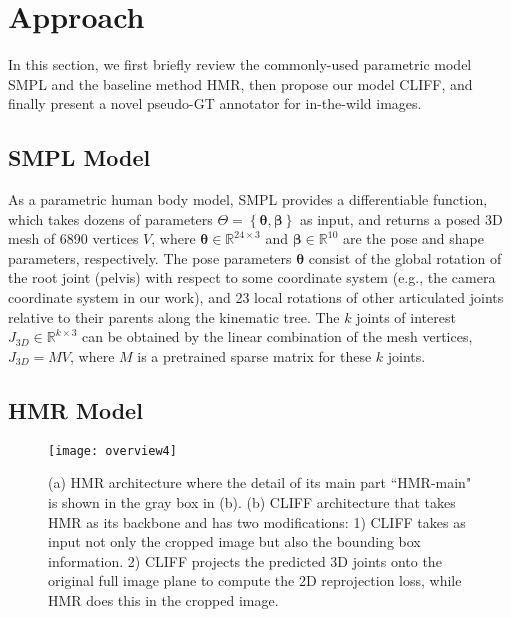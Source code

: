 \documentclass[runningheads]{llncs}
\begin{document}
\section{Approach}\label{sec:approach}

In this section, we first briefly review the commonly-used parametric model SMPL and the baseline method HMR, then propose our model CLIFF, and finally present a novel pseudo-GT annotator for in-the-wild images.

\subsection{SMPL Model}
As a parametric human body model, SMPL \cite{loper2015smpl} provides a differentiable function, which takes dozens of parameters $\Theta = {\left\{ \bm{\theta}, \bm{\beta} \right\}}$ as input, and returns a posed 3D mesh of 6890 vertices $V$, where $\bm{\theta} \in \mathbb{R}^{24\times3}$ and $\bm{\beta} \in \mathbb{R}^{10}$ are the pose and shape parameters, respectively.
The pose parameters $\bm{\theta}$ consist of the global rotation of the root joint (pelvis) with respect to some coordinate system (e.g., the camera coordinate system in our work), and 23 local rotations of other articulated joints relative to their parents along the kinematic tree.
The $k$ joints of interest $J_{3D} \in \mathbb{R}^{k\times3}$ can be obtained by the linear combination of the mesh vertices, $J_{3D} = MV$, where $M$ is a pretrained sparse matrix for these $k$ joints.

\subsection{HMR Model}

\begin{figure}[t]
	\centering
	\texttt{[image: overview4]}
	\caption {(a) HMR architecture where the detail of its main part ``HMR-main" is shown in the gray box in (b). (b) CLIFF architecture that takes HMR as its backbone and has two modifications: 1) CLIFF takes as input not only the cropped image but also the bounding box information. 2) CLIFF projects the predicted 3D joints onto the original full image plane to compute the 2D reprojection loss, while HMR does this in the cropped image.}
	\label{fig:overview}
\end{figure}
\end{document}
